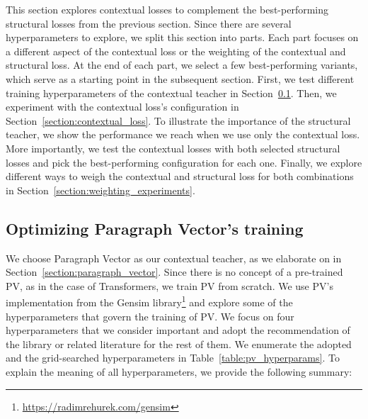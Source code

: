 This section explores contextual losses to complement the best-performing
structural losses from the previous section. Since there are several
hyperparameters to explore, we split this section into parts. Each part focuses
on a different aspect of the contextual loss or the weighting of the contextual
and structural loss. At the end of each part, we select a few best-performing
variants, which serve as a starting point in the subsequent section. First, we
test different training hyperparameters of the contextual teacher in
Section~\ref{section:pv_training}. Then, we experiment with the contextual
loss's configuration in Section~\ref{section:contextual_loss}. To illustrate
the importance of the structural teacher, we show the performance we reach when
we use only the contextual loss. More importantly, we test the contextual
losses with both selected structural losses and pick the best-performing
configuration for each one. Finally, we explore different ways to weigh the
contextual and structural loss for both combinations in
Section~\ref{section:weighting_experiments}.

\subsection{Optimizing Paragraph Vector's training}\label{section:pv_training}

We choose Paragraph Vector \citep{le2014distributed} as our contextual teacher,
as we elaborate on in Section~\ref{section:paragraph_vector}. Since there is no
concept of a pre-trained PV, as in the case of Transformers, we train PV from
scratch. We use PV's implementation from the Gensim
library\footnote{\label{fn:link_to_gensim}\url{https://radimrehurek.com/gensim}}
and explore some of the hyperparameters that govern the training of PV. We
focus on four hyperparameters that we consider important and adopt the
recommendation of the library or related literature for the rest of them. We
enumerate the adopted and the grid-searched hyperparameters in
Table~\ref{table:pv_hyperparams}. To explain the meaning of all
hyperparameters, we provide the following summary:


